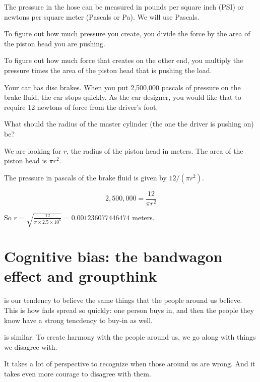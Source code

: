 The pressure in the hose can be measured in pounds per square inch
(PSI) or newtons per square meter (Pascals or Pa). We will use Pascals.

To figure out how much pressure you create, you divide the force by
the area of the piston head you are pushing.

To figure out how much force that creates on the other end, you
multiply the pressure times the area of the piston head that is
pushing the load.

\begin{Exercise}[title={Hydraulics}, label=hydraulics]

Your car has disc brakes. When you put 2,500,000 pascals of pressure on the
brake fluid, the car stops quickly. As the car designer, you would like
that to require 12 newtons of force from the driver's foot.

What should the radius of the master cylinder (the one the driver is pushing on) be?
\end{Exercise}
\begin{Answer}[ref=hydraulics]
  We are looking for $r$, the radius of the piston head in meters. The area of the piston head is $\pi r^2$.

  The pressure in pascals of the brake fluid is given by $12 / (\pi r^2)$.

  $$2,500,000 = \frac{12}{\pi r^2}$$

  So $r = \sqrt{\frac{12}{\pi \times 2.5 \times 10^6}} = 0.001236077446474$ meters.

\end{Answer}

\section{Cognitive bias: the bandwagon effect and groupthink}

 is our tendency to believe the same
things that the people around us believe. This is how fads spread so
quickly: one person buys in, and then the people they know have a
strong tencdency to buy-in as well.

 is similar: To create harmony with the
people around us, we go along with things we disagree with.

It takes a lot of perspective to recognize when those around us are
wrong. And it takes even more courage to disagree with them.

